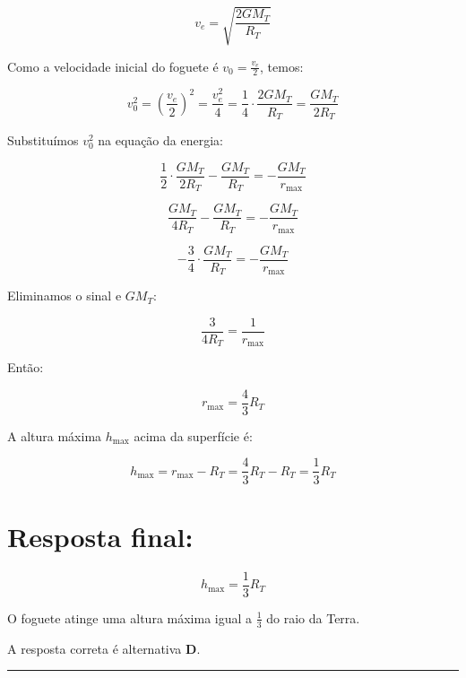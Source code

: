\documentclass[a4paper,12pt]{article}
\begin{document}
\begin{flushleft}
\[
v_e = \sqrt{\frac{2 G M_T}{R_T}}
\]

Como a velocidade inicial do foguete é \(v_0 = \frac{v_e}{2}\), temos:

\[
v_0^2 = \left( \frac{v_e}{2} \right)^2 = \frac{v_e^2}{4} = \frac{1}{4} \cdot \frac{2 G M_T}{R_T} = \frac{G M_T}{2 R_T}
\]

Substituímos \(v_0^2\) na equação da energia:

\[
\frac{1}{2} \cdot \frac{G M_T}{2 R_T} - \frac{G M_T}{R_T} = - \frac{G M_T}{r_{\text{max}}}
\]

\[
\frac{G M_T}{4 R_T} - \frac{G M_T}{R_T} = - \frac{G M_T}{r_{\text{max}}}
\]

\[
-\frac{3}{4} \cdot \frac{G M_T}{R_T} = - \frac{G M_T}{r_{\text{max}}}
\]

Eliminamos o sinal e \(G M_T\):

\[
\frac{3}{4 R_T} = \frac{1}{r_{\text{max}}}
\]

Então:

\[
r_{\text{max}} = \frac{4}{3} R_T
\]

A altura máxima \(h_{\text{max}}\) acima da superfície é:

\[
h_{\text{max}} = r_{\text{max}} - R_T = \frac{4}{3} R_T - R_T = \frac{1}{3} R_T
\]

\section*{Resposta final:}

\[
\boxed{h_{\text{max}} = \frac{1}{3} R_T}
\]

O foguete atinge uma altura máxima igual a \(\frac{1}{3}\) do raio da Terra.


A resposta correta é alternativa \colorbox{green!50}{\textbf{D}}.
\end{flushleft}

\noindent\rule{\linewidth}{0.6pt}\\
\end{document}
